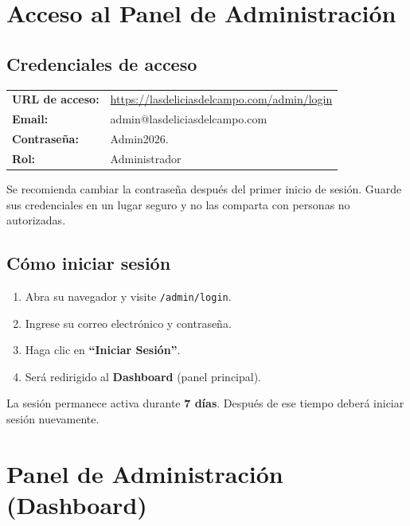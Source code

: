 \documentclass[12pt,a4paper]{article}
\begin{document}
\section{Acceso al Panel de Administración}

\subsection{Credenciales de acceso}

\begin{credentialbox}
\begin{tabularx}{\textwidth}{lX}
    \textbf{URL de acceso:} & \url{https://lasdeliciasdelcampo.com/admin/login} \\
    \textbf{Email:} & admin@lasdeliciasdelcampo.com \\
    \textbf{Contraseña:} & Admin2026. \\
    \textbf{Rol:} & Administrador \\
\end{tabularx}
\end{credentialbox}

\begin{warningbox}
Se recomienda cambiar la contraseña después del primer inicio de sesión. Guarde sus credenciales en un lugar seguro y no las comparta con personas no autorizadas.
\end{warningbox}

\subsection{Cómo iniciar sesión}

\begin{enumerate}[leftmargin=2cm]
    \item Abra su navegador y visite \texttt{/admin/login}.
    \item Ingrese su correo electrónico y contraseña.
    \item Haga clic en \textbf{``Iniciar Sesión''}.
    \item Será redirigido al \textbf{Dashboard} (panel principal).
\end{enumerate}

La sesión permanece activa durante \textbf{7 días}. Después de ese tiempo deberá iniciar sesión nuevamente.

\section{Panel de Administración (Dashboard)}
\end{document}
